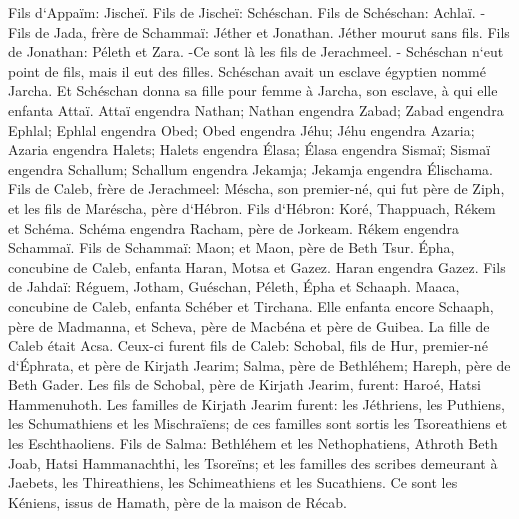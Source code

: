 \verse Fils d`Appaïm: Jischeï. Fils de Jischeï: Schéschan. Fils de Schéschan: Achlaï. - 
\verse Fils de Jada, frère de Schammaï: Jéther et Jonathan. Jéther mourut sans fils. 
\verse Fils de Jonathan: Péleth et Zara. -Ce sont là les fils de Jerachmeel. - 
\verse Schéschan n`eut point de fils, mais il eut des filles. Schéschan avait un esclave égyptien nommé Jarcha. 
\verse Et Schéschan donna sa fille pour femme à Jarcha, son esclave, à qui elle enfanta Attaï. 
\verse Attaï engendra Nathan; Nathan engendra Zabad; 
\verse Zabad engendra Ephlal; Ephlal engendra Obed; 
\verse Obed engendra Jéhu; Jéhu engendra Azaria; 
\verse Azaria engendra Halets; Halets engendra Élasa; 
\verse Élasa engendra Sismaï; Sismaï engendra Schallum; 
\verse Schallum engendra Jekamja; Jekamja engendra Élischama. 
\verse Fils de Caleb, frère de Jerachmeel: Méscha, son premier-né, qui fut père de Ziph, et les fils de Maréscha, père d`Hébron. 
\verse Fils d`Hébron: Koré, Thappuach, Rékem et Schéma. 
\verse Schéma engendra Racham, père de Jorkeam. Rékem engendra Schammaï. 
\verse Fils de Schammaï: Maon; et Maon, père de Beth Tsur. 
\verse Épha, concubine de Caleb, enfanta Haran, Motsa et Gazez. Haran engendra Gazez. 
\verse Fils de Jahdaï: Réguem, Jotham, Guéschan, Péleth, Épha et Schaaph. 
\verse Maaca, concubine de Caleb, enfanta Schéber et Tirchana. 
\verse Elle enfanta encore Schaaph, père de Madmanna, et Scheva, père de Macbéna et père de Guibea. La fille de Caleb était Acsa. 
\verse Ceux-ci furent fils de Caleb: Schobal, fils de Hur, premier-né d`Éphrata, et père de Kirjath Jearim; 
\verse Salma, père de Bethléhem; Hareph, père de Beth Gader. 
\verse Les fils de Schobal, père de Kirjath Jearim, furent: Haroé, Hatsi Hammenuhoth. 
\verse Les familles de Kirjath Jearim furent: les Jéthriens, les Puthiens, les Schumathiens et les Mischraïens; de ces familles sont sortis les Tsoreathiens et les Eschthaoliens. 
\verse Fils de Salma: Bethléhem et les Nethophatiens, Athroth Beth Joab, Hatsi Hammanachthi, les Tsoreïns; 
\verse et les familles des scribes demeurant à Jaebets, les Thireathiens, les Schimeathiens et les Sucathiens. Ce sont les Kéniens, issus de Hamath, père de la maison de Récab. 

\chapter{}

